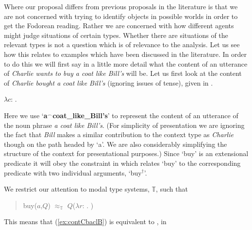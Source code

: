 Where our proposal differs from previous proposals in the literature
is that we are not concerned with trying to identify
objects in possible worlds in order to get the Fodorean reading.
Rather we are concerned with how different agents might judge
situations of certain types.  Whether there are situations of the
relevant types is not a question which is of relevance to the
analysis.  Let us see how this relates to examples which have been
discussed in the literature.  
In order to do this we will first say in a little more detail what the
content of an utterance of \textit{Charlie wants to buy a coat like
  Bill's} will be.  Let us first look at the content of
\textit{Charlie bought a coat like Bill's} (ignoring issues of tense), given in \nexteg{}.
\begin{ex}
  $\lambda c$: . 
\label{ex:contCbaclB} 
\end{ex} 
Here we use `\textbf{a$^\frown$coat\_like\_Bill's}' to represent the
  content of an utterance of the noun phrase \textit{a coat like
    Bill's}.  (For simplicity of presentation we are ignoring the fact
  that \textit{Bill} makes a similar contribution to the context type
  as \textit{Charlie} though on the path headed by `a'.  We are also
  considerably simplifying the structure of the context for
  presentational purposes.)
Since `buy' is an extensional predicate it will obey the constraint in
\nexteg{} which relates `buy' to the corresponding predicate with two
individual arguments, `buy$^\dagger$'.
\begin{ex}
  We restrict our attention to modal type systems, $\mathbb{T}$, such
  that
  \begin{quote}
buy($a$,$Q$) $\approx_{\mathbb{T}}$ $Q$($\lambda
r$:
. )
\end{quote}
\end{ex} 
This means that (\ref{ex:contCbaclB}) is equivalent to \nexteg{}, in
